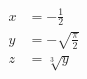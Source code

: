   \begin{align}
    x &= - \frac{1}{2} \\
    y &= - \sqrt{\frac{\pi}{2}}\\
    z &= \sqrt[3]{y}
  \end{align}
